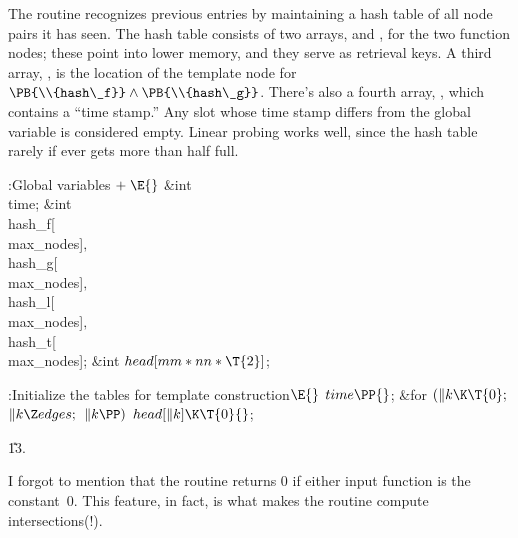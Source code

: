 The  routine recognizes previous entries by
maintaining
a hash table of all node pairs it has seen. The hash table consists of
two arrays,  and , for the two function nodes;
these point
into lower memory, and they serve as retrieval keys.
A third array, , is the location of the template node for
$\PB{\\{hash\_f}}\land\PB{\\{hash\_g}}$.
There's also a fourth array, , which contains a
``time stamp.'' Any slot whose time stamp differs from the global variable
 is considered empty. Linear probing works well, since the hash
table rarely if ever gets more than half full.

\Y\B\4:Global variables\X${}\mathrel+\E{}$\6
\&{int} \\{time};\6
\&{int} \\{hash\_f}[\\{max\_nodes}]${},{}$ \\{hash\_g}[\\{max\_nodes}]${},{}$ %
\\{hash\_l}[\\{max\_nodes}]${},{}$ \\{hash\_t}[\\{max\_nodes}];\6
\&{int} ${}\\{head}[\\{mm}*\\{nn}*\T{2}]{}$;\par
\fi

\B{}:Initialize the tables for template construction\X${}\E{}$\6
$\\{time}\PP{}$;\6
\&{for} ${}(\|k\K\T{0};{}$ ${}\|k\Z\\{edges};{}$ ${}\|k\PP){}$\1\5
${}\\{head}[\|k]\K\T{0}{}$;\2\par
\U13.\fi

I forgot to mention that
the  routine returns 0 if either input function is the
constant~0. This feature, in fact, is what makes the  routine
compute intersections(!).

